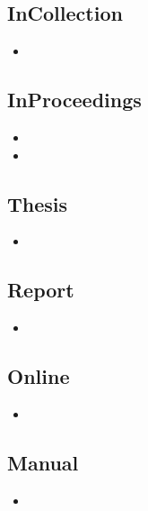 \subsection{InCollection}

\begin{itemize}
\item {}
\end{itemize}

\subsection{InProceedings}

\begin{itemize}
\item {}
\item {}
\end{itemize}

\subsection{Thesis}

\begin{itemize}
\item {}
\end{itemize}

\subsection{Report}

\begin{itemize}
\item {}
\end{itemize}


\subsection{Online}

\begin{itemize}
\item {}
\end{itemize}

\subsection{Manual}

\begin{itemize}
\item {}
\end{itemize}

